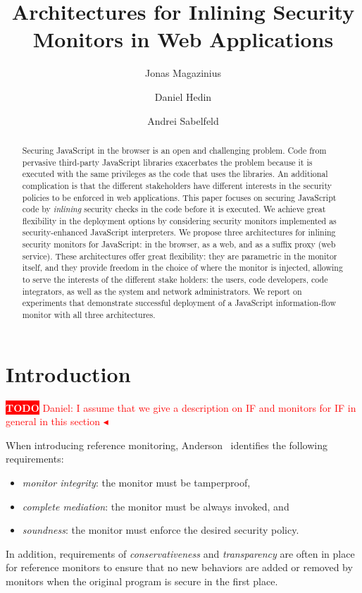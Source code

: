 \documentclass{llncs}
\title{Architectures for Inlining Security Monitors in Web Applications}
\author{Jonas Magazinius \and Daniel Hedin \and Andrei Sabelfeld}
\institute{Chalmers University of Technology, Gothenburg, Sweden}
\newcommand{\todo}[1]{\colorbox{red}{\textcolor{white}{\sffamily\bfseries\scriptsize TODO}} \textcolor{red}{#1} \textcolor{red}{$\blacktriangleleft$}}
\begin{document}
\maketitle



\begin{abstract}
Securing JavaScript in the browser is an open and challenging
problem. Code from pervasive third-party JavaScript libraries exacerbates the
problem because it is executed with the same privileges as the code
that uses the libraries.
%
An additional complication is that the different stakeholders have
different interests in the security policies to be enforced
in web applications.
%
This paper focuses on securing JavaScript code by \emph{inlining}
security checks in the code before it is executed.
%
We achieve great flexibility in the deployment options by considering
security monitors implemented as security-enhanced JavaScript interpreters.
%
We propose three architectures for inlining security monitors for JavaScript: in
the browser, as a web, and as a suffix proxy (web service). 
%
These architectures offer great flexibility: they are parametric in the monitor itself,
and they provide freedom in the choice of where the monitor is
injected, allowing to serve the interests of the different stake
holders: the users, code developers, code
integrators, as well as the system and network administrators.
%
We report on experiments that demonstrate successful deployment of a JavaScript
information-flow monitor with all three architectures.
\end{abstract}










\section{Introduction}
\label{sec:intro}

\todo{Daniel: I assume that we give a description on IF and monitors for IF in general in this section}

When introducing reference monitoring, Anderson~\cite{Anderson:72}
identifies the following requirements:
\begin{itemize}
\item \emph{monitor integrity}: the monitor must be tamperproof,
\item \emph{complete mediation}: the monitor must be always invoked, and
\item \emph{soundness}: the monitor must enforce the desired
  security policy.
\end{itemize}
In addition, requirements of \emph{conservativeness} and
\emph{transparency} are often in place for reference monitors to
ensure that no new behaviors are added or removed by monitors when the
original program is secure in the first place.
\end{document}
